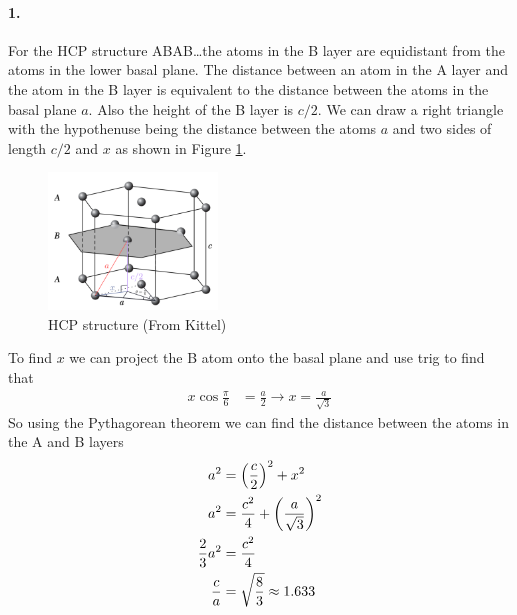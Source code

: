 \documentclass[../main.tex]{subfiles}
\begin{document}
\pagestyle{fancy}

\renewcommand\thefigure{\arabic{figure}} 
\paragraph*{1.} For the HCP structure ABAB\dots the atoms in the B layer are equidistant from the atoms
in the lower basal plane. The distance between an atom in the A layer and the atom in the B layer
is equivalent to the distance between the atoms in the basal plane $a$. Also the height of the B
layer is $c/2$. We can draw a right triangle with the hypothenuse being the distance between the atoms $a$ and
two sides of length $c/2$ and $x$ as shown in Figure \ref{fig:hw1_1}.

\begin{figure}[ht]
    \centering
    \includegraphics[width=0.4\textwidth]{hw1_1.png}
    \caption{HCP structure (From Kittel)}
    \label{fig:hw1_1}
\end{figure}
To find $x$ we can project the B atom onto the basal plane and
use trig to find that
\begin{align*}
    x \cos{\frac{\pi}{6}} &= \frac{a}{2} \to x = \frac{a}{\sqrt{3}}
\end{align*}
So using the Pythagorean theorem we can find the distance between the atoms in the A and B layers
\begin{align*}
    a^2 &= \qt(\frac{c}{2})^2 + x^2 \\
    a^2 &= \frac{c^2}{4} + \qt(\frac{a}{\sqrt{3}})^2 \\
    \frac{2}{3} a^2 &= \frac{c^2}{4} \\
    \frac{c}{a} &= \sqrt{\frac{8}{3}} \approx 1.633
\end{align*}
\end{document}

